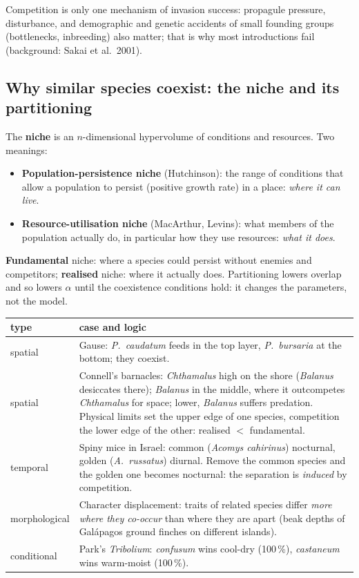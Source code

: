 Competition is only one mechanism of invasion success: propagule pressure, disturbance, and demographic and genetic
accidents of small founding groups (bottlenecks, inbreeding) also matter; that is why most introductions fail
(background: Sakai et al.\ 2001).

\subsection{Why similar species coexist: the niche and its partitioning}
The \textbf{niche} is an $n$-dimensional hypervolume of conditions and resources. Two meanings:
\begin{itemize}
\item \textbf{Population-persistence niche} (Hutchinson): the range of conditions that allow a population to persist
(positive growth rate) in a place: \emph{where it can live}.
\item \textbf{Resource-utilisation niche} (MacArthur, Levins): what members of the population actually do, in particular
how they use resources: \emph{what it does}.
\end{itemize}
\textbf{Fundamental} niche: where a species could persist without enemies and competitors; \textbf{realised} niche:
where it actually does. Partitioning lowers overlap and so lowers $\alpha$ until the coexistence conditions hold: it
changes the parameters, not the model.

\begin{center}\small
\begin{tabularx}{\textwidth}{lX}
\toprule
type & case and logic\\\midrule
spatial & Gause: \emph{P.\ caudatum} feeds in the top layer, \emph{P.\ bursaria} at the bottom; they coexist.\\
spatial & Connell's barnacles: \emph{Chthamalus} high on the shore (\emph{Balanus} desiccates there); \emph{Balanus} in the
middle, where it outcompetes \emph{Chthamalus} for space; lower, \emph{Balanus} suffers predation. Physical limits set
the upper edge of one species, competition the lower edge of the other: realised $<$ fundamental.\\
temporal & Spiny mice in Israel: common (\emph{Acomys cahirinus}) nocturnal, golden (\emph{A.\ russatus}) diurnal. Remove the
common species and the golden one becomes nocturnal: the separation is \emph{induced} by competition.\\
morphological & Character displacement: traits of related species differ \emph{more where they co-occur} than where
they are apart (beak depths of Galápagos ground finches on different islands).\\
conditional & Park's \emph{Tribolium}: \emph{confusum} wins cool-dry (100\,\%), \emph{castaneum} wins warm-moist (100\,\%).\\\bottomrule
\end{tabularx}
\end{center}

